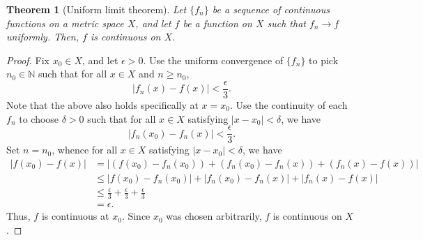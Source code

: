 \documentclass[11pt]{article}
\def\N{\mathbb{N}}
\newtheorem{theorem}{Theorem}[section]
\theoremstyle{definition}
\theoremstyle{remark}
\begin{document}
    \begin{theorem}[Uniform limit theorem] \label{theo:uniform_limit}
        Let $\{f_n\}$ be a sequence of continuous functions on a metric space $X$,
        and let $f$ be a function on $X$ such that $f_n \to f$ uniformly. Then, $f$
        is continuous on $X$.
    \end{theorem}
    \begin{proof}
        Fix $x_0 \in X$, and let $\epsilon > 0$.
        Use the uniform convergence of $\{f_n\}$ to pick $n_0 \in \N$ such that for
        all $x \in X$ and $n \geq n_0$, \[
            |f_n(x) - f(x)| < \frac{\epsilon}{3}.
        \] Note that the above also holds specifically at $x = x_0$.
        Use the continuity of each $f_n$ to choose $\delta > 0$ such that for all $x
        \in X$ satisfying $|x - x_0| < \delta$, we have \[
            |f_n(x_0) - f_n(x)| < \frac{\epsilon}{3}.
        \] Set $n = n_0$, whence for all $x \in X$ satisfying $|x - x_0| < \delta$,
        we have
        \begin{align*}
            |f(x_0) - f(x)| &= |(f(x_0) - f_n(x_0)) + (f_n(x_0) - f_n(x)) + (f_n(x)
            - f(x))| \\
            &\leq |f(x_0) - f_n(x_0)| + |f_n(x_0) - f_n(x)| + |f_n(x) - f(x)| \\
            &\leq \frac{\epsilon}{3} + \frac{\epsilon}{3} + \frac{\epsilon}{3} \\
            &= \epsilon.
        \end{align*}
        Thus, $f$ is continuous at $x_0$. Since $x_0$ was chosen arbitrarily, $f$ is
        continuous on $X$.
    \end{proof}
\end{document}
